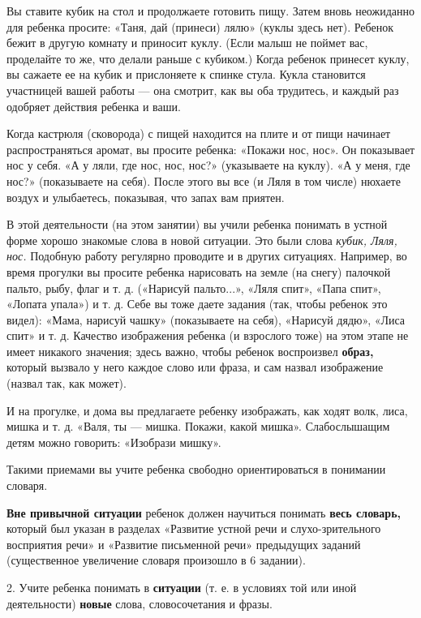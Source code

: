 \documentclass{book}
\renewcommand{\emph}[1]{\textit{#1}}
\begin{document}
Вы ставите кубик на стол и продолжаете готовить пищу. Затем вновь
неожиданно для ребенка просите: «Таня, дай (принеси) лялю» (куклы здесь
нет). Ребенок бежит в другую комнату и приносит куклу. (Если малыш не
поймет вас, проделайте то же, что делали раньше с кубиком.) Когда
ребенок принесет куклу, вы сажаете ее на кубик и прислоняете к спинке
стула. Кукла становится участницей вашей работы --- она смотрит, как вы
оба трудитесь, и каждый раз одобряет действия ребенка и ваши.

Когда кастрюля (сковорода) с пищей находится на плите и от пищи начинает
распространяться аромат, вы просите ребенка: «Покажи нос, нос». Он
показывает нос у себя. «А у ляли, где нос, нос, нос?» (указываете на
куклу). «А у меня, где нос?» (показываете на себя). После этого вы все
(и Ляля в том числе) нюхаете воздух и улыбаетесь, показывая, что запах
вам приятен.

В этой деятельности (на этом занятии) вы учили ребенка понимать в устной
форме хорошо знакомые слова в новой ситуации. Это были слова
\emph{кубик, Ляля, нос.} Подобную работу регулярно проводите и в других
ситуациях. Например, во время прогулки вы просите ребенка нарисовать на
земле (на снегу) палочкой пальто, рыбу, флаг и т. д. («Нарисуй
пальто...», «Ляля спит», «Папа спит», «Лопата упала») и т. д. Себе вы
тоже даете задания (так, чтобы ребенок это видел): «Мама, нарисуй чашку»
(показываете на себя), «Нарисуй дядю», «Лиса спит» и т. д. Качество
изображения ребенка (и взрослого тоже) на этом этапе не имеет никакого
значения; здесь важно, чтобы ребенок воспроизвел \textbf{образ,} который
вызвало у него каждое слово или фраза, и сам назвал изображение (назвал
так, как может).

И на прогулке, и дома вы предлагаете ребенку изображать, как ходят волк,
лиса, мишка и т. д. «Валя, ты --- мишка. Покажи, какой мишка».
Слабослышащим детям можно говорить: «Изобрази мишку».

Такими приемами вы учите ребенка свободно ориентироваться в понимании
словаря.

\textbf{Вне привычной ситуации} ребенок должен научиться понимать
\textbf{весь словарь,} который был указан в разделах «Развитие устной
речи и слухо-зрительного восприятия речи» и «Развитие письменной речи»
предыдущих заданий (существенное увеличение словаря произошло в 6
задании).

2. Учите ребенка понимать в \textbf{ситуации} (т. е. в условиях той или
иной деятельности) \textbf{новые} слова, словосочетания и фразы.
\end{document}
